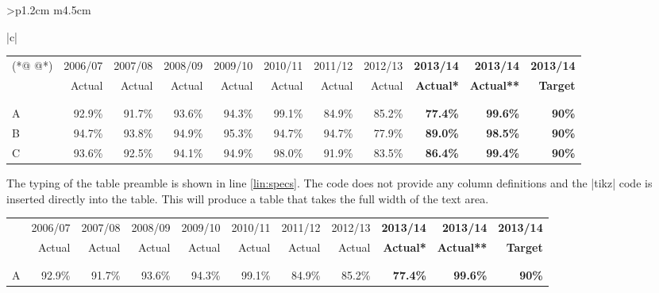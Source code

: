 \begin{tabular}{>{\bfseries}p{1.2cm} m{4.5cm}}
\begin{tabular}[t]{|c|}
\begin{longtable}
\begin{scriptexample}{}{}
\begin{teXXX}
{\scriptsize
\begin{tabular}[\textwidth]{@{}l r r r r r r r>{\bfseries\color{black!80}}r >{\bfseries\color{black!80}}r >{\bfseries\color{black!80}}r@{}}  (*@\label{lin:specs} @*)
& 2006/07 &2007/08 &2008/09 &2009/10 &2010/11 &2011/12 &2012/13 &2013/14 &2013/14 &2013/14\\
& Actual &Actual &Actual &Actual &Actual &Actual &Actual &Actual* &Actual** &Target\\
\begin{tikzpicture}[remember picture, overlay]
\path [midrule] (0,0) -- (\the\linewidth+5pt,0) node {};
\end{tikzpicture}\\ \\[-1pt]
A   &92.9\% &91.7\% &93.6\% &94.3\% &99.1\% &84.9\% &85.2\% &77.4\% &99.6\% &90\%\\

B  &94.7\% &93.8\% &94.9\% &95.3\% &94.7\% &94.7\% &77.9\% &89.0\% &98.5\% &90\%\\

C  &93.6\% &92.5\% &94.1\% &94.9\% &98.0\% &91.9\% &83.5\% &86.4\% &99.4\% &90\%\\
\end{tabular}
}
\end{teXXX}
\end{scriptexample}

The typing of the table preamble is shown in line \ref{lin:specs}. The code does not provide any column definitions and the |tikz| code is inserted directly into the table. This will produce a table that takes the full width of the
text area. 
\bigskip
\parindent 0pt




{\footnotesize
\begin{tabular}[\textwidth]{@{}l r r r r r r r>{\bfseries\color{black!80}}r >{\bfseries\color{black!80}}r >{\bfseries\color{black!80}}r@{}} 
& 2006/07 &2007/08 &2008/09 &2009/10 &2010/11 &2011/12 &2012/13 &2013/14 &2013/14 &2013/14\\
& Actual &Actual &Actual &Actual &Actual &Actual &Actual &Actual* &Actual** &Target\\
\begin{tikzpicture}[remember picture, overlay]
\path [midrule] (0,0) -- (\the\linewidth+8.5pt,0) node {};
\end{tikzpicture}\\ \\[-1pt]
A   &92.9\% &91.7\% &93.6\% &94.3\% &99.1\% &84.9\% &85.2\% &77.4\% &99.6\% &90\%\\


\end{tabular}}
\end{longtable}
\end{tabular}
\end{tabular}
